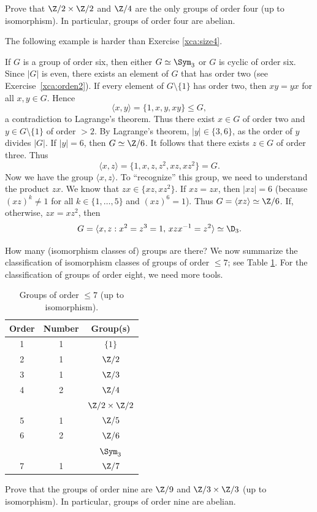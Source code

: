 \begin{exercise}
\label{xca:size4}
Prove that $\Z/2\times\Z/2$ and $\Z/4$ are 
the only groups of order four (up to isomorphism). In particular, 
groups of order four are abelian. 
\end{exercise}

The following example is harder than
Exercise \ref{xca:size4}.

\begin{example}
If $G$ is a group of order six, then
either $G\simeq\Sym_3$ or $G$ is cyclic of order six. 
Since $|G|$ is even, there exists an element of $G$ 
that has order two (see Exercise~\ref{xca:orden2}). 
If every element of $G\setminus\{1\}$ has order two, then
$xy=yx$ for all $x,y\in G$. Hence 
\[
\langle x,y\rangle=\{1,x,y,xy\}\leq G,
\]
a contradiction to Lagrange's theorem. Thus there exist 
$x\in G$ of order two 
and $y\in G\setminus\{1\}$ of order $>2$. 
By Lagrange's theorem, $|y|\in\{3,6\}$, 
as the order of $y$ divides $|G|$. If 
$|y|=6$, 
then $G\simeq\Z/6$. It follows that there exists 
$z\in G$ of order three. Thus 
\[
\langle x,z\rangle=\{1,x,z,z^2,xz,xz^2\}=G.
\]
Now we have the group $\langle x,z\rangle$. To ``recognize'' this group,
we need to understand the product $zx$. We know that
$zx\in\{xz,xz^2\}$. If $xz=zx$, then $|xz|=6$ (because
$(xz)^k\ne1$ for all $k\in\{1,\dots,5\}$ and
$(xz)^6=1$). Thus 
$G=\langle xz\rangle\simeq\Z/6$. If, otherwise, 
$zx=xz^2$, then 
\[
G=\langle x,z:x^2=z^3=1,\,xzx^{-1}=z^2\rangle\simeq\D_3.
\]
\end{example}

How many (isomorphism classes of) groups are there? We now summarize the classification 
of isomorphism classes of groups of order $\leq7$; see
Table \ref{tab:grupos<8}. For the classification of groups
of order eight, we need more tools. 

\begin{table}[ht]
    \caption{Groups of order $\leq7$ (up to isomorphism).}

    \begin{tabular}{|c|c|c|}
    \hline
    Order & Number & Group(s)\\
    \hline
        1 & 1 & $\{1\}$ \\
        2 & 1 & $\Z/2$ \\
        3 & 1 & $\Z/3$ \\
        4 & 2 & $\Z/4$ \\
        && $\Z/2\times\Z/2$ \\
        5 & 1 & $\Z/5$ \\
        6 & 2 & $\Z/6$\\
        &&$\Sym_3$ \\
        7 & 1 & $\Z/7$ \\
    \hline
    \end{tabular}
    \label{tab:grupos<8}
\end{table}

\begin{exercise}
\label{xca:size9}
Prove that the groups of order nine are 
$\Z/9$ and $\Z/3\times\Z/3$ (up to isomorphism). In particular, groups of order
nine are abelian. 
\end{exercise}

